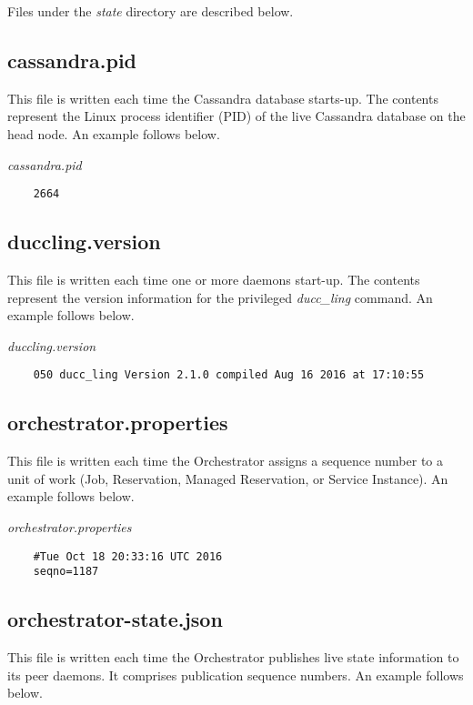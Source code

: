 	Files under the {\em state} directory are described below.
	
	\subsection{cassandra.pid}
	
	This file is written each time the {\DUCC} Cassandra database starts-up.
	The contents represent the Linux process identifier (PID) of the
	live {\DUCC} Cassandra database on the head node.
	An example follows below.
	
	{\em cassandra.pid}
	\begin{verbatim}
	2664
	\end{verbatim}
	
	\subsection{duccling.version}
	
	This file is written each time one or more {\DUCC} daemons start-up.
	The contents represent the version information for the 
	privileged {\em ducc\_ling} command.
	An example follows below.
	
	{\em duccling.version}
	\begin{verbatim}
	050 ducc_ling Version 2.1.0 compiled Aug 16 2016 at 17:10:55
	\end{verbatim}
	
	\subsection{orchestrator.properties}
	
	This file is written each time the {\DUCC} Orchestrator assigns 
	a sequence number to a unit of work (Job, Reservation, Managed Reservation,
	or Service Instance).
	An example follows below.
	
	{\em orchestrator.properties}
	\begin{verbatim}
	#Tue Oct 18 20:33:16 UTC 2016
	seqno=1187
	\end{verbatim}
	
	\subsection{orchestrator-state.json}
	
	This file is written each time the {\DUCC} Orchestrator publishes
	live state information to its peer daemons.  
	It comprises publication sequence numbers.
	An example follows below.
	
